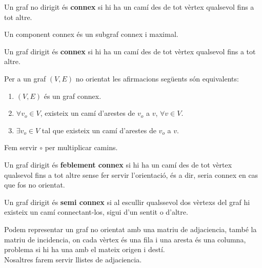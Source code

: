 \documentclass[../main.tex]{subfiles}
\begin{document}
    \begin{definicio}
        Un graf no dirigit és \textbf{connex} si hi ha un camí des de tot vèrtex qualsevol fins a tot 
        altre.
    \end{definicio}
    \begin{definicio}
        Un component connex és un subgraf connex i maximal.
    \end{definicio}
    \begin{definicio}
        Un graf dirigit és \textbf{connex} si hi ha un camí des de tot vèrtex qualsevol fins a tot 
        altre.
    \end{definicio}
    \begin{proposicio}
        Per a un graf $(V, E)$ no orientat les afirmacions següents són equivalents:
        \begin{enumerate}
            \item $(V, E)$ és un graf connex.
            \item $\forall v_o\in V$, existeix un camí d'arestes de $v_o$ a $v$, $\forall v \in V$.
            \item $\exists v_o \in V$ tal que existeix un camí d'arestes de $v_o$ a $v$.
        \end{enumerate}
    \end{proposicio}
    \begin{notacio}
        Fem servir $\circ$ per multiplicar camins. 
    \end{notacio}
    \begin{definicio}
        Un graf dirigit és \textbf{feblement connex} si hi ha un camí des de tot vèrtex qualsevol fins a tot 
        altre sense fer servir l'orientació, és a dir, seria connex en cas que fos no orientat.
    \end{definicio}
    \begin{definicio}
        Un graf dirigit és \textbf{semi connex} si al escullir qualssevol dos vèrtexs del graf hi
        existeix un camí connectant-los, sigui d'un sentit o d'altre.
    \end{definicio}
    Podem representar un graf no orientat amb una matriu de adjaciencia, també la matriu de
    incidencia, on cada vèrtex és una fila i una aresta és una columna, problema si hi ha una amb
    el mateix origen i destí.\\
    Nosaltres farem servir llistes de adjaciencia.
\end{document}
